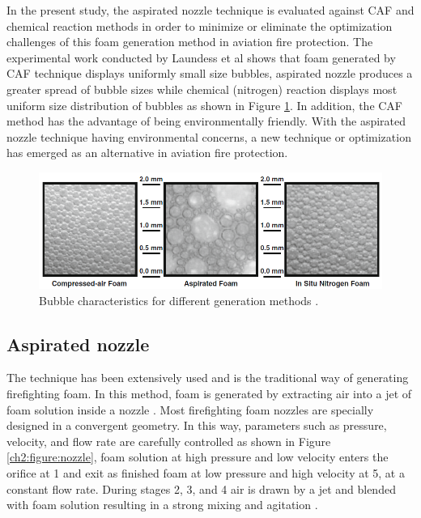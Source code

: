 \documentclass[12pt]{report}
\begin{document}
In the present study, the aspirated nozzle technique is evaluated against CAF and chemical reaction methods in order to minimize or eliminate the optimization challenges of this foam generation method in aviation fire protection. The experimental work conducted by Laundess et al \cite{laundess2012suppression} shows that foam generated by CAF technique displays uniformly small size bubbles, aspirated nozzle produces a greater spread of bubble sizes while chemical (nitrogen) reaction displays most uniform size distribution of bubbles as shown in Figure \ref{ch2:figure:characteristics}. In addition, the CAF method has the advantage of being environmentally friendly.  With the aspirated nozzle technique having environmental concerns, a new technique or optimization has emerged as an alternative in aviation fire protection.

\begin{figure}[H]
    \centering
    \includegraphics[width=.95\textwidth]{bubble_characteristics.png}
    \caption{Bubble characteristics for different generation methods \cite{laundess2012suppression}.}
    \label{ch2:figure:characteristics}
\end{figure}

\subsection{Aspirated nozzle}
The technique has been extensively used and is the traditional way of generating firefighting foam. In this method, foam is generated by extracting air into a jet of foam solution inside a nozzle \cite{xi2017experimental}. Most firefighting foam nozzles are specially designed in a convergent geometry. In this way, parameters such as pressure, velocity, and flow rate are carefully controlled as shown in Figure \ref{ch2:figure:nozzle}, foam solution at high pressure and low velocity enters the orifice at 1 and exit as finished foam at low pressure and high velocity at 5, at a constant flow rate. During stages 2, 3, and 4 air is drawn by a jet and blended with foam solution resulting in a strong mixing and agitation \cite{csb2016phenomenological}.
\end{document}
